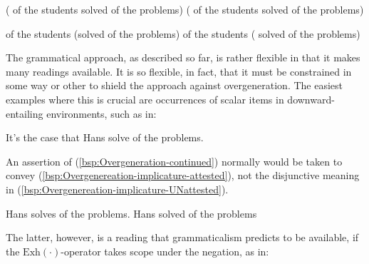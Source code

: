 \documentclass[fleqn,reqno,10pt,draft]{article}
\newcommand{\exh}{\ensuremath{\mathrm{Exh}}}
\begin{document}
\begin{exe}
  \ex \label{Grammar-Global}
    \begin{xlist}
      \ex \label{Grammar-Global-AE} \mymark{$\exh$}( of the students solved
         of the problems)
      \ex \label{Grammar-Global-GE} \mymark{$\exh$}( of the students solved
         of the problems)
    \end{xlist}
\end{exe}

\begin{exe}
  \ex \label{Grammar-Local}
    \begin{xlist}
      \ex \label{Grammar-Local-AE}  of the students \mymark{$\exh$}(solved
         of the problems)
      \ex \label{Grammar-Local-GE}  of the
        students \mymark{$\exh$}( solved
         of the problems)
    \end{xlist}
\end{exe}

The grammatical approach, as described so far, is rather flexible in
that it makes many readings available. It is so flexible, in fact,
that it must be constrained in some way or other to shield the
approach against overgeneration. The easiest examples where this is
crucial are occurrences of scalar items in downward-entailing
environments, such as in:

\begin{exe}
\ex \label{bsp:Overgenereation-target} It's  the case that
  Hans solve  of the problems.
\end{exe}

\noindent An assertion of (\ref{bsp:Overgeneration-continued})
normally would be taken to convey
(\ref{bsp:Overgenereation-implicature-attested}), not the disjunctive
meaning in (\ref{bsp:Overgenereation-implicature-UNattested}).

\begin{exe}
\ex 
  \begin{xlist}
  \ex \label{bsp:Overgenereation-implicature-attested} Hans solves  of the problems.
  \ex \label{bsp:Overgenereation-implicature-UNattested} Hans solved
     of the problems 
  \end{xlist}
\end{exe}

\noindent The latter, however, is a reading that grammaticalism
predicts to be available, if the $\exh(\cdot)$-operator takes scope
under the negation, as in:
\end{document}
